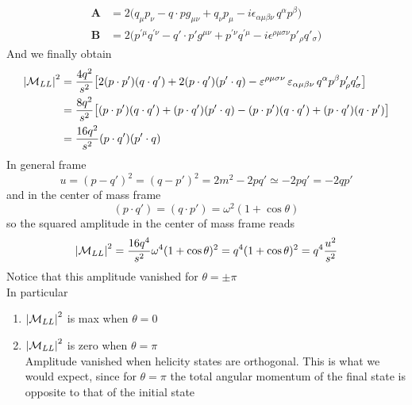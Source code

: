 \documentclass[TheoreticalPhy_ModB.tex]{subfiles}
\begin{document}
\begin{align*}
\textbf{A}	& = 2 \bigl( q_{\mu}p_{\nu} - q \cdot p g_{\mu\nu} + q_{\nu}p_{\mu} - i \epsilon_{\alpha\mu\beta\nu} \, q^{\alpha}p^{\beta} \bigr) \\
\textbf{B}	& = 2 \bigl( p^{\prime \mu} q^{\prime \nu} - q' \cdot p' g^{\mu\nu} + p^{\prime \nu} q^{\prime \mu} 
	- i \epsilon^{\rho\mu\sigma\nu} p'_{\rho} q'_{\sigma} \bigr)
\end{align*}
And we finally obtain
\begin{align*}
\left\lvert \mathcal{M}_{LL} \right\rvert^2 
	& = \frac{4q^2}{s^2} \bigl[ 2(p \cdot p')(q \cdot q') + 2(p \cdot q')(p' \cdot q) - \varepsilon^{\rho\mu\sigma\nu} \, \varepsilon_{\alpha\mu\beta\nu} \,
		q^{\alpha} p^{\beta} p'_{\rho} q'_{\sigma} \bigr] \\
	& = \frac{8q^2}{s^2} \bigl[ (p \cdot p') (q \cdot q') + (p \cdot q')(p' \cdot q) - (p \cdot p')(q \cdot q') + (p \cdot q')(q \cdot p') \bigr] \\
	& =  \frac{16q^2}{s^2} (p \cdot q')(p' \cdot q)
\end{align*}
In general frame
\[
u = (p - q')^2 = (q - p')^2 = 2m^2 - 2pq' \simeq -2pq' = -2qp'
\]
and in the center of mass frame
\[
(p \cdot q') = (q \cdot p') = \omega^2(1 + \cos \theta)
\]
so the squared amplitude in the center of mass frame reads
\[
\left\lvert \mathcal{M}_{LL} \right\rvert^2 = \frac{16q^4}{s^2} \omega^4 (1 + \cos \theta)^2 = q^4(1 + \cos \theta)^2 = q^4 \frac{u^2}{s^2}
\]
Notice that this amplitude vanished for $\theta = \pm \pi$\\
In particular
\begin{enumerate}
\item $\left\lvert \mathcal{M}_{LL} \right\rvert^2$ is max when $\theta = 0$
\item $\left\lvert \mathcal{M}_{LL} \right\rvert^2$ is zero when $\theta = \pi$\\
	Amplitude vanished when helicity states are orthogonal. This  is what we would expect, since for $\theta = \pi$ the total angular momentum of the final state is opposite to that of the initial state 
\end{enumerate}
\end{document}
